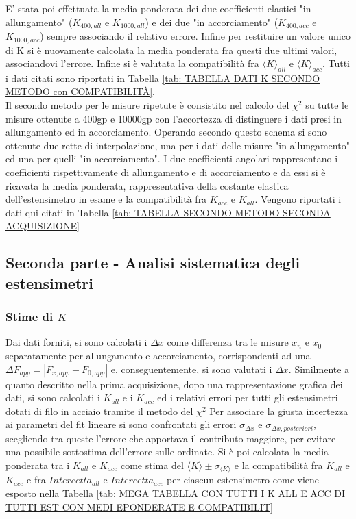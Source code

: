 \documentclass[a4paper,11pt,oneside]{article}
\begin{document}
E' stata poi effettuata la media ponderata dei due coefficienti elastici "in allungamento" ($K_{400, all}$ e $K_{1000, all}$) e dei due "in accorciamento" ($K_{400, acc}$ e $K_{1000, acc}$) sempre associando il relativo errore. Infine per restituire un valore unico di K si è nuovamente calcolata la media ponderata fra questi due ultimi valori, associandovi l'errore. Infine si è valutata la compatibilità fra ${\langle K \rangle}_{all}$ e ${\langle K \rangle}_{acc}$. Tutti i dati citati sono riportati in Tabella \ref{tab: TABELLA DATI K SECONDO METODO con COMPATIBILITÀ}.\\

Il secondo metodo per le misure ripetute è consistito nel calcolo del $\chi^2$ su tutte le misure ottenute a 400gp e 10000gp con l'accortezza di distinguere i dati presi in allungamento ed in accorciamento. Operando secondo questo schema si sono ottenute due rette di interpolazione, una per i dati delle misure "in allungamento" ed una per quelli "in accorciamento". I due coefficienti angolari rappresentano i coefficienti rispettivamente di allungamento e di accorciamento e da essi si è ricavata la media ponderata, rappresentativa della costante elastica dell'estensimetro in esame e la compatibilità fra ${K}_{acc}$ e ${K}_{all}$. Vengono riportati i dati qui citati in Tabella \ref{tab: TABELLA SECONDO METODO SECONDA ACQUISIZIONE}


\subsection{Seconda parte - Analisi sistematica degli estensimetri}
\subsubsection*{Stime di $K$}
Dai dati forniti, si sono calcolati i $\Delta x$ come differenza tra le misure $x_n$ e $x_0$ separatamente per allungamento e accorciamento, corrispondenti ad una $\Delta F_{app} =\left | F_{x, app} - F_{0, app} \right |$ e, conseguentemente, si sono valutati i $\Delta x$.
Similmente a quanto descritto nella prima acquisizione, dopo una rappresentazione grafica dei dati, si sono calcolati i $K_{all}$ e i $K_{acc}$ ed i relativi errori per tutti gli estensimetri dotati di filo in acciaio tramite il metodo del $\chi^2$
Per associare la giusta incertezza ai parametri del fit lineare si sono confrontati gli errori $\sigma_{\Delta x}$ e $\sigma_{\Delta x, posteriori}$, scegliendo tra queste l'errore che apportava il contributo maggiore, per evitare una possibile sottostima dell'errore sulle ordinate.
Si è poi calcolata la media ponderata tra i $K_{all}$ e $K_{acc}$ come stima del ${\langle K \rangle }\pm \sigma_{{\langle K\rangle }}$ e la compatibilità fra $K_{all}$ e $K_{acc}$ e fra $Intercetta_{all}$ e $Intercetta_{acc}$ per ciascun estensimetro come viene esposto nella Tabella \ref{tab: MEGA TABELLA CON TUTTI I K ALL E ACC DI TUTTI EST CON MEDI EPONDERATE E COMPATIBILIT}
\end{document}
